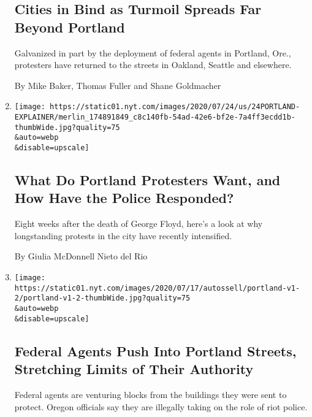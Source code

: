\begin{enumerate}
{  \subsection{Cities in Bind as Turmoil Spreads Far Beyond
  Portland}\label{cities-in-bind-as-turmoil-spreads-far-beyond-portland}}

  Galvanized in part by the deployment of federal agents in Portland,
  Ore., protesters have returned to the streets in Oakland, Seattle and
  elsewhere.

  By Mike Baker, Thomas Fuller and Shane Goldmacher
\item
  \href{/article/portland-protests-explained-protesters.html}{}

  \texttt{[image: https://static01.nyt.com/images/2020/07/24/us/24PORTLAND-EXPLAINER/merlin\_174891849\_c8c140fb-54ad-42e6-bf2e-7a4ff3ecdd1b-thumbWide.jpg?quality=75\\\&auto=webp\\\&disable=upscale]}

  \hypertarget{what-do-portland-protesters-want-and-how-have-the-police-responded}{%
  \subsection{What Do Portland Protesters Want, and How Have the Police
  Responded?}\label{what-do-portland-protesters-want-and-how-have-the-police-responded}}

  Eight weeks after the death of George Floyd, here's a look at why
  longstanding protests in the city have recently intensified.

  By Giulia McDonnell Nieto del Rio
\item
  \href{/2020/07/25/us/portland-federal-legal-jurisdiction-courts.html}{}

  \texttt{[image: https://static01.nyt.com/images/2020/07/17/autossell/portland-v1-2/portland-v1-2-thumbWide.jpg?quality=75\\\&auto=webp\\\&disable=upscale]}

  \hypertarget{federal-agents-push-into-portland-streets-stretching-limits-of-their-authority}{%
  \subsection{Federal Agents Push Into Portland Streets, Stretching
  Limits of Their
  Authority}\label{federal-agents-push-into-portland-streets-stretching-limits-of-their-authority}}

  Federal agents are venturing blocks from the buildings they were sent
  to protect. Oregon officials say they are illegally taking on the role
  of riot police.


\end{enumerate}
